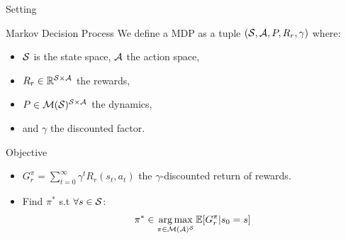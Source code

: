 \documentclass{beamer}
\begin{document}
    \begin{frame}{Setting}
        \begin{block}{Markov Decision Process}
            We define a MDP as a tuple $(\mathcal{S}, \mathcal{A}, P, R_r, \gamma)$ where:
            \begin{itemize}
                \pause\item  $\mathcal{S}$ is the state space, $\mathcal{A}$ the action space,
                \pause\item $R_r\in\mathbb{R}^{\mathcal{S} \times \mathcal{A}}$ the rewards,
                \pause\item $P\in \mathcal{M}(\mathcal{S})^{\mathcal{S} \times \mathcal{A}}$ the dynamics, %
                \pause\item and $\gamma$ the discounted factor.
            \end{itemize}
        \end{block}
        \pause
        \begin{block}{Objective}
            \begin{itemize}
                \pause\item $G_r^\pi = \sum_{t=0}^\infty \gamma^t R_r(s_t, a_t)$ the $\gamma$-discounted return of rewards.
                \pause\item Find $\pi^*$ s.t $\forall s\in\mathcal{S}$:
                \begin{equation}
                    \label{eq:mdp}
                    \begin{array}{lcr}
                        \displaystyle \pi^* \in \operatorname*{arg\,max}_{\pi\in\mathcal{M}(\mathcal{A})^{\mathcal{S}}} \operatorname*{\mathbb{E}}[G_r^\pi | s_0=s]
                    \end{array}
                \end{equation}

            \end{itemize}
        \end{block}
    \end{frame}
\end{document}
